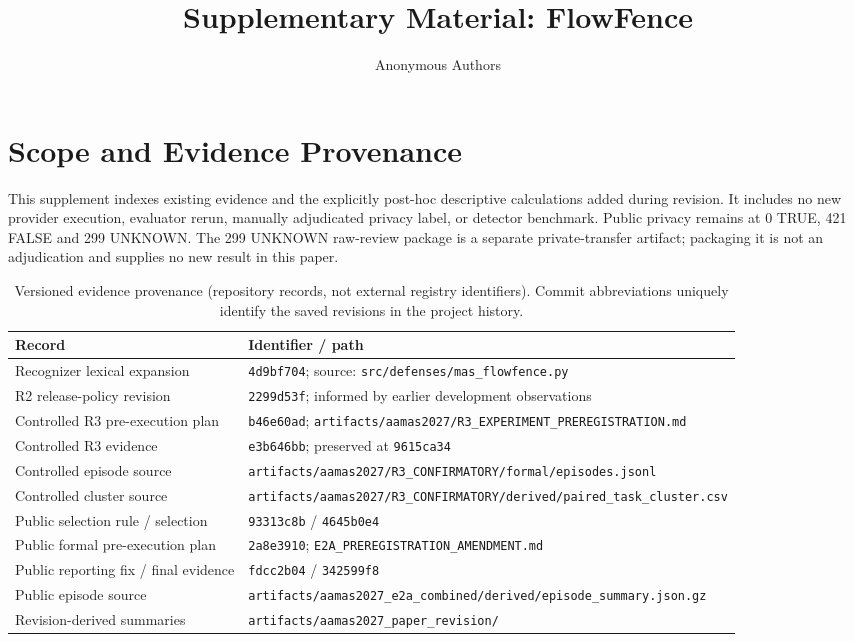 \documentclass[sigconf,anonymous]{aamas}
\title{Supplementary Material: FlowFence}
\author{Anonymous Authors}
\begin{document}
\maketitle

\section{Scope and Evidence Provenance}
This supplement indexes existing evidence and the explicitly post-hoc descriptive calculations added during revision. It includes no new provider execution, evaluator rerun, manually adjudicated privacy label, or detector benchmark. Public privacy remains at 0 TRUE, 421 FALSE and 299 UNKNOWN. The 299 UNKNOWN raw-review package is a separate private-transfer artifact; packaging it is not an adjudication and supplies no new result in this paper.

\begin{table}[t]
\caption{Versioned evidence provenance (repository records, not external registry identifiers). Commit abbreviations uniquely identify the saved revisions in the project history.}
\centering\small
\begin{tabular}{@{}lL{0.62\textwidth}@{}}
\toprule
Record & Identifier / path \\
\midrule
Recognizer lexical expansion & \texttt{4d9bf704}; source: \texttt{src/defenses/mas\_flowfence.py} \\
R2 release-policy revision & \texttt{2299d53f}; informed by earlier development observations \\
Controlled R3 pre-execution plan & \texttt{b46e60ad}; \texttt{artifacts/aamas2027/R3\_EXPERIMENT\_PREREGISTRATION.md} \\
Controlled R3 evidence & \texttt{e3b646bb}; preserved at \texttt{9615ca34} \\
Controlled episode source & \texttt{artifacts/aamas2027/R3\_CONFIRMATORY/formal/episodes.jsonl} \\
Controlled cluster source & \texttt{artifacts/aamas2027/R3\_CONFIRMATORY/derived/paired\_task\_cluster.csv} \\
Public selection rule / selection & \texttt{93313c8b} / \texttt{4645b0e4} \\
Public formal pre-execution plan & \texttt{2a8e3910}; \texttt{E2A\_PREREGISTRATION\_AMENDMENT.md} \\
Public reporting fix / final evidence & \texttt{fdcc2b04} / \texttt{342599f8} \\
Public episode source & \texttt{artifacts/aamas2027\_e2a\_combined/derived/episode\_summary.json.gz} \\
Revision-derived summaries & \texttt{artifacts/aamas2027\_paper\_revision/} \\
\bottomrule
\end{tabular}
\end{table}
\end{document}
